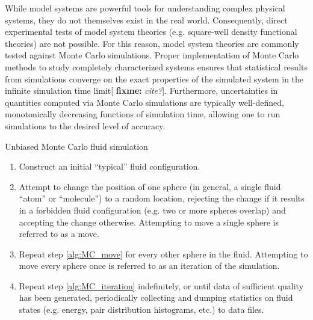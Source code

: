 \documentclass[11pt]{article}
\newenvironment{alg}
{\hrulefill\begin{enumerate}}
{\end{enumerate}\hrulefill}
\newcommand{\red}[1]{{\bf \color{red} #1}}
\newcommand{\fixme}[1]{[\red{fixme:} \emph{#1}]}
\begin{document}
While model systems are powerful tools for understanding complex
physical systems, they do not themselves exist in the real
world. Consequently, direct experimental tests of model system
theories (e.g. square-well density functional theories) are not
possible. For this reason, model system theories are commonly tested
against Monte Carlo simulations. Proper implementation of Monte Carlo
methods to study completely characterized systems ensures that
statistical results from simulations converge on the exact properties
of the simulated system in the infinite simulation time
limit\fixme{cite?}. Furthermore, uncertainties in quantities computed
via Monte Carlo simulations are typically well-defined, monotonically
decreasing functions of simulation time, allowing one to run
simulations to the desired level of accuracy.

\begin{algorithm}[!b]
  \caption{Unbiased Monte Carlo fluid simulation}
  \label{alg:MC}
  \begin{alg}

  \item Construct an initial ``typical'' fluid configuration.

  \item Attempt to change the position of one sphere (in general, a
    single fluid ``atom'' or ``molecule'') to a random location,
    rejecting the change if it results in a forbidden fluid
    configuration (e.g. two or more spheres overlap) and accepting the
    change otherwise. Attempting to move a single sphere is referred
    to as a move. \label{alg:MC_move}

  \item Repeat step \ref{alg:MC_move} for every other sphere in the
    fluid. Attempting to move every sphere once is referred to as an
    iteration of the simulation.
    \label{alg:MC_iteration}

  \item Repeat step \ref{alg:MC_iteration} indefinitely, or until data
    of sufficient quality has been generated, periodically collecting
    and dumping statistics on fluid states (e.g. energy, pair
    distribution histograms, etc.) to data files.

  \end{alg}
\end{algorithm}
\end{document}

